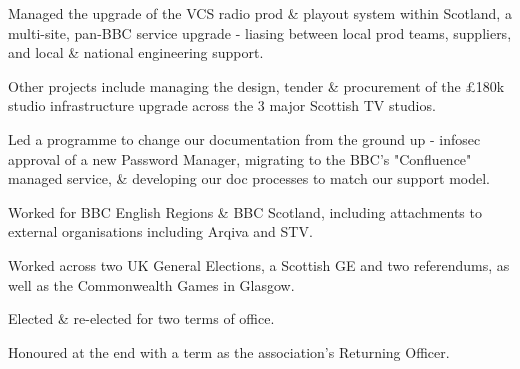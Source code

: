 \documentclass[]{deedy-resume-openfont}
\begin{document}
\begin{minipage}[t]{0.66\textwidth}
\begin{tightemize}
\item Managed the upgrade of the VCS radio prod \& playout system within Scotland, a multi-site, pan-BBC service upgrade - liasing between local prod teams, suppliers, and local \& national engineering support.
\item Other projects include managing the design, tender \& procurement of the £180k studio infrastructure upgrade across the 3 major Scottish TV studios.
\item Led a programme to change our documentation from the ground up - infosec approval of a new Password Manager, migrating to the BBC's "Confluence" managed service, \& developing our doc processes to match our support model.
\end{tightemize}
\sectionsep

\sectionsep

\begin{tightemize}
\item Worked for BBC English Regions \& BBC Scotland, including attachments to external organisations including Arqiva and STV.
\item Worked across two UK General Elections, a Scottish GE and two referendums, as well as the Commonwealth Games in Glasgow.
\end{tightemize}
\sectionsep

\begin{tightemize}
\item Elected \& re-elected for two terms of office.
\item Honoured at the end with a term as the association's Returning Officer.
\end{tightemize}
\sectionsep

\end{minipage} 
\end{document}
